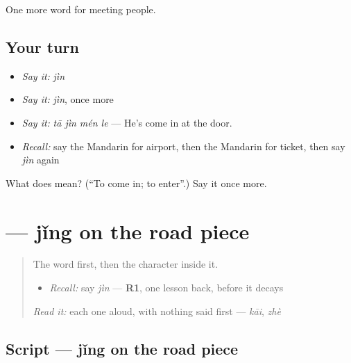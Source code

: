 \begin{grammarlens}[title={What you've built}]
One more word for meeting people.
\end{grammarlens}

\subsection*{Your turn}
\begin{itemize}
\raggedright
  \item \emph{Say it:} \emph{jìn}
  \item \emph{Say it:} \emph{jìn}, once more
  \item \emph{Say it:} \emph{tā jìn mén le} — He's come in at the door.
  \item \emph{Recall:} say the Mandarin for airport, then the Mandarin for ticket, then say \emph{jìn} again
\end{itemize}

\begin{tcolorbox}[breakable,colback=teal!4,colframe=teal!35!black,title={Before you move on}]
What does  mean? (\textquotedblleft{}To come in; to enter\textquotedblright{}.) Say it once more.
\end{tcolorbox}
\section[\texorpdfstring{\zh{进} (jìn)}{进 (jìn)}]{ — jǐng on the road piece}

\label{lesson:ZH-W74-jin-enter}



\begin{quote}
The word first, then the character inside it.

\begin{itemize}
\raggedright
  \item \emph{Recall:} say \emph{jìn} — \textbf{R1}, one lesson back, before it decays
\end{itemize}

\begin{quote}
 
\end{quote}

\emph{Read it:} each one aloud, with nothing said first — \emph{kāi}, \emph{zhè}
\end{quote}

\subsection*{Script — jǐng on the road piece}

